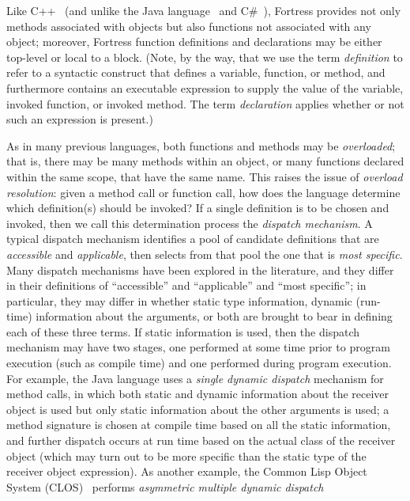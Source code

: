 Like C++~\cite{C-PLUS-PLUS} (and unlike the Java language~\cite{JLS1}
and C\#~\cite{CSHARP-ECMA-334-2001}), Fortress provides not
only methods associated with objects but also functions not associated with
any object; moreover, Fortress function definitions and declarations may be either
top-level or local to a block.  (Note, by the way, that we use the term
\emph{definition} to refer to a syntactic construct that defines a variable, function,
or method, and furthermore contains an executable expression to supply
the value of the variable, invoked function, or invoked method.
The term \emph{declaration} applies whether or not such an expression is present.)

As in many previous languages, both functions and methods may be
\emph{overloaded}; that is, there may be many methods within an
object, or many functions declared within the same scope, that have
the same name.  This raises the issue of \emph{overload resolution}:
given a method call or function call, how does the language determine
which definition(s) should be invoked?  If a single
definition is to be chosen and invoked, then we call this determination
process the \emph{dispatch mechanism}.  A typical dispatch mechanism
identifies a pool of candidate definitions that are \emph{accessible}
and \emph{applicable}, then selects from that pool the one that is
\emph{most specific}.  Many dispatch mechanisms have
been explored in the literature, and they differ in their definitions
of ``accessible'' and ``applicable'' and ``most specific'';
in particular, they may differ in whether static type information,
dynamic (run-time) information about the arguments, or both are
brought to bear in defining each of these three terms.
If static information is used, then the dispatch mechanism may
have two stages, one performed at some time prior to program
execution (such as compile time) and one performed during program
execution.
For example, the Java language uses a \emph{single dynamic dispatch} mechanism
for method calls,
in which both static and dynamic information about the receiver
object is used but only static information about the other arguments
is used; a method signature is chosen at compile time based on all
the static information, and further dispatch occurs at run time
based on the actual class of the receiver object (which may turn out to be
more specific than the static type of the receiver object expression).
As another example, the Common Lisp Object System (CLOS)~\cite{ECOOP87-CLOS,CLOS-SPECIFICATION,CLTL2,CACM-CLOS}
performs \emph{asymmetric multiple dynamic dispatch}
